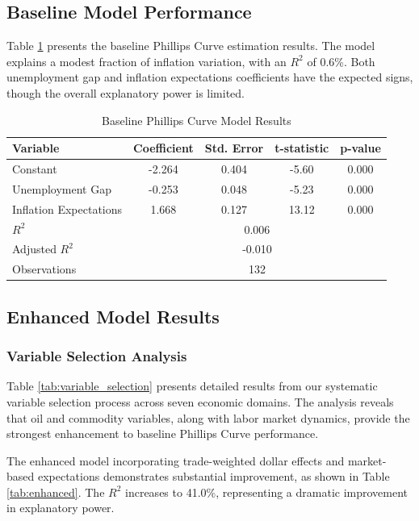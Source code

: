 \documentclass[12pt]{article}
\begin{document}


\subsection{Baseline Model Performance}

Table \ref{tab:baseline} presents the baseline Phillips Curve estimation results. The model explains a modest fraction of inflation variation, with an $R^2$ of 0.6\%. Both unemployment gap and inflation expectations coefficients have the expected signs, though the overall explanatory power is limited.

\begin{table}[H]
\centering
\caption{Baseline Phillips Curve Model Results}
\label{tab:baseline}
\begin{tabular}{lcccc}
\toprule
Variable & Coefficient & Std. Error & t-statistic & p-value \\
\midrule
Constant & -2.264 & 0.404 & -5.60 & 0.000 \\
Unemployment Gap & -0.253 & 0.048 & -5.23 & 0.000 \\
Inflation Expectations & 1.668 & 0.127 & 13.12 & 0.000 \\
\midrule
$R^2$ & \multicolumn{4}{c}{0.006} \\
Adjusted $R^2$ & \multicolumn{4}{c}{-0.010} \\
Observations & \multicolumn{4}{c}{132} \\
\bottomrule
\end{tabular}
\end{table}

\subsection{Enhanced Model Results}

\subsubsection{Variable Selection Analysis}

Table \ref{tab:variable_selection} presents detailed results from our systematic variable selection process across seven economic domains. The analysis reveals that oil and commodity variables, along with labor market dynamics, provide the strongest enhancement to baseline Phillips Curve performance.



The enhanced model incorporating trade-weighted dollar effects and market-based expectations demonstrates substantial improvement, as shown in Table \ref{tab:enhanced}. The $R^2$ increases to 41.0\%, representing a dramatic improvement in explanatory power.
\end{document}
